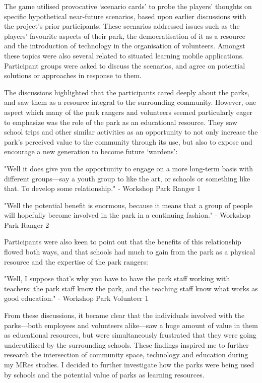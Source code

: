 The game utilised provocative `scenario cards' to probe the players’ thoughts on specific hypothetical near-future scenarios, based upon earlier discussions with the project's prior participants. These scenarios addressed issues such as the players’ favourite aspects of their park, the democratisation of it as a resource and the introduction of technology in the organisation of volunteers. Amongst these topics were also several related to situated learning mobile applications. Participant groups were asked to discuss the scenarios, and agree on potential solutions or approaches in response to them.

The discussions highlighted that the participants cared deeply about the parks, and saw them as a resource integral to the surrounding community. However, one aspect which many of the park rangers and volunteers seemed particularly eager to emphasize was the role of the park as an educational resource. They saw school trips and other similar activities as an opportunity to not only increase the park’s perceived value to the community through its use, but also to expose and encourage a new generation to become future ‘wardens’:

\begin{displayquote}
"Well it does give you the opportunity to engage on a more long-term basis with different groups---say a youth group to like the art, or schools or something like that. To develop some relationship." - Workshop Park Ranger 1
\end{displayquote}

\begin{displayquote}
"Well the potential benefit is enormous, because it means that a group of people will hopefully become involved in the park in a continuing fashion." - Workshop Park Ranger 2
\end{displayquote}

Participants were also keen to point out that the benefits of this relationship flowed both ways, and that schools had much to gain from the park as a physical resource and the expertise of the park rangers:

\begin{displayquote}
"Well, I suppose that's why you have to have the park staff working with teachers: the park staff know the park, and the teaching staff know what works as good education." - Workshop Park Volunteer 1
\end{displayquote}

From these discussions, it became clear that the individuals involved with the parks---both employees and volunteers alike---saw a huge amount of value in them as educational resources, but were simultaneously frustrated that they were going underutilized by the surrounding schools. These findings inspired me to further research the intersection of community space, technology and education during my MRes studies. I decided to further investigate how the parks were being used by schools and the potential value of parks as learning resources.

